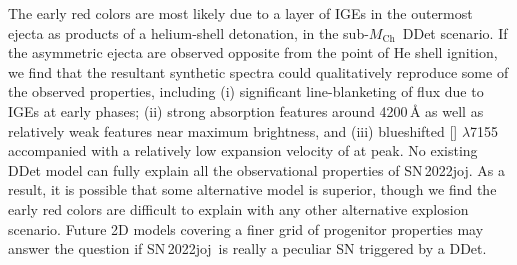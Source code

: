\documentclass[twocolumn]{aastex631}
\newcommand{\sn}{SN\,2022joj}
\newcommand{\Mch}{$M_\mathrm{Ch}$}
\newcommand{\chang}[1]{\textcolor{blue}{[Chang: #1]}}
\begin{document}
\begin{CJK*}{UTF8}{gbsn}
The early red colors are most likely due to a layer of IGEs in the outermost ejecta as products of a helium-shell detonation, in the sub-\Mch\ DDet scenario. If the asymmetric ejecta are observed opposite from the point of He shell ignition, we find that the resultant synthetic spectra could qualitatively reproduce some of the observed properties, including (i) significant line-blanketing of flux due to IGEs at early phases; (ii) strong absorption features around 4200\,\r{A} as well as relatively weak  features near maximum brightness, and (iii) blueshifted [] $\lambda$7155 accompanied with a relatively low expansion velocity of  at peak. %
No existing DDet model can fully explain all the observational properties of \sn. As a result, it is possible that some alternative model is superior, though we find the early red colors are difficult to explain with any other alternative explosion scenario. Future 2D models covering a finer grid of progenitor properties may answer the question if \sn\ is really a peculiar SN triggered by a DDet.\\





\end{CJK*}
\end{document}
